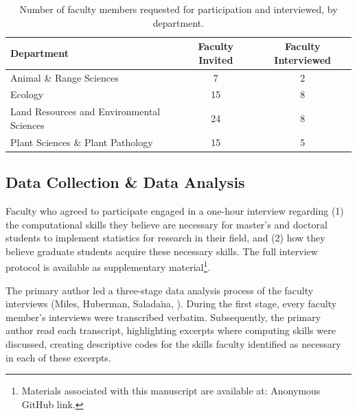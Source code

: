 \documentclass[12pt]{article}
\begin{document}
{
\begin{table}[h!]
\centering
\begin{tabular}{lcc}
\hline
Department & Faculty Invited & Faculty Interviewed  \\
\hline
Animal \& Range Sciences & 7 & 2 \\
Ecology & 15 & 8 \\
Land Resources and Environmental Sciences & 24 & 8 \\
Plant Sciences \& Plant Pathology &  15 & 5 \\ 
\hline
\end{tabular}
\caption{Number of faculty members requested for participation and interviewed,
by department.}
\label{tab:faculty}
\end{table}
}

\subsection{Data Collection \& Data Analysis}  

\noindent Faculty who agreed to participate engaged in a one-hour 
interview regarding (1) the computational skills they believe are necessary for
master's and doctoral students to implement statistics for research in their
field, and (2) how they believe graduate students acquire these necessary
skills. The full interview protocol is available as supplementary 
material\footnote{Materials associated with this manuscript are available at: 
Anonymous GitHub link.}.



\quad The primary author led a three-stage data analysis process of the faculty
interviews (Miles, Huberman, Salada$\tilde{\text{n}}$a, \citeyear{miles}). 
During the first stage, every faculty member's interviews were transcribed
verbatim. Subsequently, the primary author read each transcript, highlighting
excerpts where computing skills were discussed, creating descriptive codes for
the skills faculty identified as necessary in each of these excerpts. 
\end{document}
